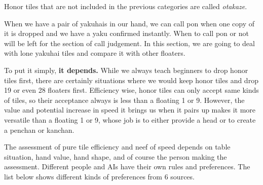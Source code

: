 \documentclass[12pt]{article}
\begin{document}
Honor tiles that are not included in the previous categories are called \textit{otakaze}.

When we have a pair of yakuhais in our hand, we can call pon when one copy of it is dropped and we have a yaku confirmed instantly. When to call pon or not will be left for the section of call judgement. In this section, we are going to deal with lone yakuhai tiles and compare it with other floaters.

To put it simply, \textbf{it depends.} While we always teach beginners to drop honor tiles first, there are certainly situations where we would keep honor tiles and drop 19 or even 28 floaters first. Efficiency wise, honor tiles can only accept same kinds of tiles, so their acceptance always is less than a floating 1 or 9. However, the value and potential increase in speed it brings us when it pairs up makes it more versatile than a floating 1 or 9, whose job is to either provide a head or to create a penchan or kanchan.

The assessment of pure tile efficiency and neef of speed depends on table situation, hand value, hand shape, and of course the person making the assessment. Different people and AIs have their own rules and preferences. The list below shows different kinds of preferences from 6 sources.
\end{document}
